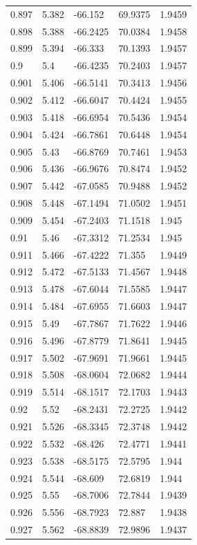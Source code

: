\begin{tabular}{lllll}
0.897 & 5.382 & -66.152 & 69.9375 & 1.9459 \\
0.898 & 5.388 & -66.2425 & 70.0384 & 1.9458 \\
0.899 & 5.394 & -66.333 & 70.1393 & 1.9457 \\
0.9 & 5.4 & -66.4235 & 70.2403 & 1.9457 \\
0.901 & 5.406 & -66.5141 & 70.3413 & 1.9456 \\
0.902 & 5.412 & -66.6047 & 70.4424 & 1.9455 \\
0.903 & 5.418 & -66.6954 & 70.5436 & 1.9454 \\
0.904 & 5.424 & -66.7861 & 70.6448 & 1.9454 \\
0.905 & 5.43 & -66.8769 & 70.7461 & 1.9453 \\
0.906 & 5.436 & -66.9676 & 70.8474 & 1.9452 \\
0.907 & 5.442 & -67.0585 & 70.9488 & 1.9452 \\
0.908 & 5.448 & -67.1494 & 71.0502 & 1.9451 \\
0.909 & 5.454 & -67.2403 & 71.1518 & 1.945 \\
0.91 & 5.46 & -67.3312 & 71.2534 & 1.945 \\
0.911 & 5.466 & -67.4222 & 71.355 & 1.9449 \\
0.912 & 5.472 & -67.5133 & 71.4567 & 1.9448 \\
0.913 & 5.478 & -67.6044 & 71.5585 & 1.9447 \\
0.914 & 5.484 & -67.6955 & 71.6603 & 1.9447 \\
0.915 & 5.49 & -67.7867 & 71.7622 & 1.9446 \\
0.916 & 5.496 & -67.8779 & 71.8641 & 1.9445 \\
0.917 & 5.502 & -67.9691 & 71.9661 & 1.9445 \\
0.918 & 5.508 & -68.0604 & 72.0682 & 1.9444 \\
0.919 & 5.514 & -68.1517 & 72.1703 & 1.9443 \\
0.92 & 5.52 & -68.2431 & 72.2725 & 1.9442 \\
0.921 & 5.526 & -68.3345 & 72.3748 & 1.9442 \\
0.922 & 5.532 & -68.426 & 72.4771 & 1.9441 \\
0.923 & 5.538 & -68.5175 & 72.5795 & 1.944 \\
0.924 & 5.544 & -68.609 & 72.6819 & 1.944 \\
0.925 & 5.55 & -68.7006 & 72.7844 & 1.9439 \\
0.926 & 5.556 & -68.7923 & 72.887 & 1.9438 \\
0.927 & 5.562 & -68.8839 & 72.9896 & 1.9437 \\

\end{tabular}
